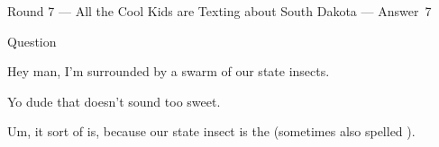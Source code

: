 \documentclass[11pt]{beamer}
\begin{document}
\begin{frame}[t]{Round 7 --- All the Cool Kids are Texting about South Dakota --- \mbox{Answer 7}}
\begin{block}{Question}

\begin{minipage}{0.9\textwidth}
\begin{mdframed}[
    roundcorner=7pt,
    backgroundcolor=black!5,
    linecolor=black!5,
    fontcolor=black,
    ignorelastdescenders]
\begin{flushleft}
{\small{}\selectfont{}
Hey man, I'm surrounded by a swarm of our state insects.
}
\end{flushleft}
\end{mdframed}
\end{minipage}

\hfill{}\begin{minipage}{0.9\textwidth}
\begin{mdframed}[
    roundcorner=7pt,
    backgroundcolor=blue!80!white,
    linecolor=blue!80!white,
    fontcolor=white,
    ignorelastdescenders]
\begin{flushleft}
{\small{}\selectfont{}
Yo dude that doesn't sound too sweet.
}
\end{flushleft}
\end{mdframed}
\end{minipage}

\begin{minipage}{0.9\textwidth}
\begin{mdframed}[
    roundcorner=7pt,
    backgroundcolor=black!5,
    linecolor=black!5,
    fontcolor=black,
    ignorelastdescenders]
\begin{flushleft}
{\small{}\selectfont{}
Um, it sort of is, because our state insect is the \textunderscore{}\textunderscore{}\textunderscore{}\textunderscore{}\textunderscore{}\textunderscore{} \textunderscore{}\textunderscore{}\textunderscore{}\textunderscore{}\textunderscore{}\textunderscore{} (sometimes also spelled \textunderscore{}\textunderscore{}\textunderscore{}\textunderscore{}\textunderscore{}\textunderscore{}).
}
\end{flushleft}
\end{mdframed}
\end{minipage}
\end{block}
\end{frame}
\end{document}
